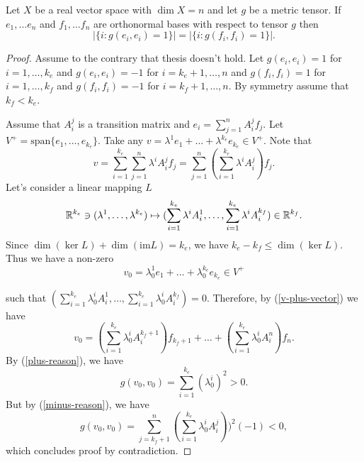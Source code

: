 \documentclass[main.tex]{subfiles}
\begin{document}
\begin{theorem}
\label{signature-theorem}
Let $X$ be a real vector space with $\dim X = n$ and let $g$ be a metric tensor. If $e_1, \dots e_n$ and $f_1, \dots f_n$ are orthonormal bases with respect to tensor $g$ then
\begin{equation}
|\{i: g(e_i, e_i) = 1 \}| = |\{i: g(f_i, f_i) = 1 \} |.
\end{equation}
\end{theorem}
\begin{proof}
Assume to the contrary that thesis doesn't hold. Let $g(e_i, e_i)=1$ for $i=1, \dots, k_e$ and $g(e_i, e_i) = -1$ for $i=k_e + 1, \dots, n$ and $g(f_i, f_i)=1$ for $i=1, \dots, k_f$ and $g(f_i, f_i) = -1$ for $i=k_f + 1, \dots, n$. By symmetry assume that $k_f < k_e$.

Assume that $A_i^j$ is a transition matrix and $e_i = \sum_{j=1}^n A_i^j f_j$. Let $V^{+} = \text{span}\{e_1, \dots, e_{k_e}\}$. Take any  $v = \lambda^1e_1 + \dots + \lambda^{k_e}e_{k_e}\in V^{+}$. 
Note that
\begin{equation}
\label{v-plus-vector} 
v = \sum_{i=1}^{k_e} \sum_{j=1}^n \lambda^i A_i^j f_j = \sum_{j=1}^n (\sum_{i=1}^{k_e} \lambda^i A_i^j) f_j.
\end{equation}
Let's consider a linear mapping $L$
\begin{equation}
\mathbb{R}^{k_e} \ni (\lambda^1, \dots, \lambda^{k_e}) \mapsto (\sum_{i=1}^{k_e} \lambda^i A_i^1, \dots, \sum_{i=1}^{k_e} \lambda^i A_i^{k_f}) \in \mathbb{R}^{k_f}.
\end{equation}
Since $\dim(\ker L ) + \dim(\text{im} L) = k_e$, we have  $k_e - k_f \leq \dim(\ker L )$. Thus we have a non-zero 
\begin{equation}
\label{plus-reason}
v_0 = \lambda_0^1e_1 + \dots + \lambda_0^{k_e}e_{k_e}\in V^{+}
\end{equation}

such that $(\sum_{i=1}^{k_e} \lambda_0^i A_i^1, \dots, \sum_{i=1}^{k_e} \lambda_0^i A_i^{k_f}) = 0$.
Therefore, by (\ref{v-plus-vector}) we have
\begin{equation}
\label{minus-reason}
v_0 = (\sum_{i=1}^{k_e} \lambda_0^i A_i^{k_f + 1}) f_{k_f + 1} + \dots + (\sum_{i=1}^{k_e} \lambda_0^i A_i^{n}) f_n.
\end{equation}
By (\ref{plus-reason}), we have
\begin{equation}
g(v_0, v_0) = \sum_{i=1}^{k_e} (\lambda_0^i)^2 > 0.
\end{equation}
But by (\ref{minus-reason}), we have
\begin{equation}
g(v_0,v_0) = \sum_{j=k_f + 1}^n (\sum_{i=1}^{k_e} \lambda_0^i A_i^j))^2 (-1) < 0,
\end{equation}
which concludes proof by contradiction.
\end{proof}
\end{document}
